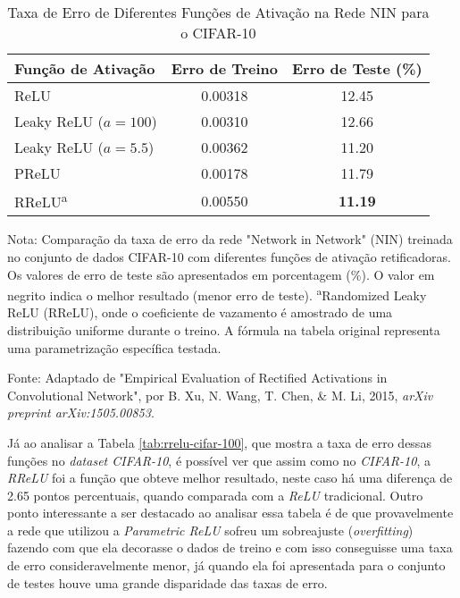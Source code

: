 \begin{table}[ht]
    \centering
    \begin{threeparttable}
        \caption{Taxa de Erro de Diferentes Funções de Ativação na Rede NIN para o CIFAR-10}
        \label{tab:rrelu-cifar-10}
        \begin{tabular}{lcc}
            \toprule
            \textbf{Função de Ativação} & \textbf{Erro de Treino} & \textbf{Erro de Teste (\%)} \\
            \midrule
            
            ReLU                      & 0.00318 & 12.45 \\
            \addlinespace %
            Leaky ReLU ($a=100$)      & 0.00310 & 12.66 \\
            Leaky ReLU ($a=5.5$)      & 0.00362 & 11.20 \\
            \addlinespace
            PReLU                     & 0.00178 & 11.79 \\
            \addlinespace
            RReLU\textsuperscript{a}  & 0.00550 & \textbf{11.19} \\
            
            \bottomrule
        \end{tabular}
        
        \begin{tablenotes}[para]
            \small
            \item[] Nota: Comparação da taxa de erro da rede "Network in Network" (NIN) treinada no conjunto de dados CIFAR-10 com diferentes funções de ativação retificadoras. Os valores de erro de teste são apresentados em porcentagem (\%). O valor em negrito indica o melhor resultado (menor erro de teste). \textsuperscript{a}Randomized Leaky ReLU (RReLU), onde o coeficiente de vazamento é amostrado de uma distribuição uniforme durante o treino. A fórmula na tabela original representa uma parametrização específica testada.
            \item[] Fonte: Adaptado de "Empirical Evaluation of Rectified Activations in Convolutional Network", por B. Xu, N. Wang, T. Chen, \& M. Li, 2015, \textit{arXiv preprint arXiv:1505.00853}.
        \end{tablenotes}

    \end{threeparttable}
\end{table}

Já ao analisar a Tabela \ref{tab:rrelu-cifar-100}, que mostra a taxa de erro dessas funções no \textit{dataset CIFAR-10}, é possível ver que assim como no \textit{CIFAR-10}, a \textit{RReLU} foi a função que obteve melhor resultado, neste caso há uma diferença de 2.65 pontos percentuais, quando comparada com a \textit{ReLU} tradicional. Outro ponto interessante a ser destacado ao analisar essa tabela é de que provavelmente a rede que utilizou a \textit{Parametric ReLU} sofreu um sobreajuste (\textit{overfitting}) fazendo com que ela decorasse o dados de treino e com isso conseguisse uma taxa de erro consideravelmente menor, já quando ela foi apresentada para o conjunto de testes houve uma grande disparidade das taxas de erro.

